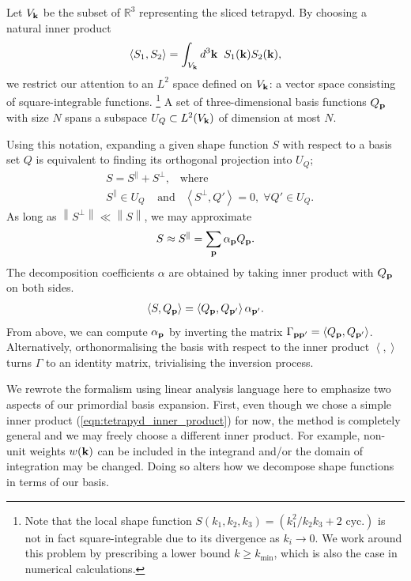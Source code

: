 Let $V_{\mathbf{k}}$ be the subset of $\mathbb{R}^3$ representing the sliced tetrapyd. By choosing a natural inner product
\begin{align}
	\left< S_1, S_2 \right> = \int_{V_{\mathbf{k}}} d^3\mathbf{k} \;\; S_1(\mathbf{k}) S_2(\mathbf{k}), \label{eqn:tetrapyd_inner_product}
\end{align}
we restrict our attention to an $L^2$ space defined on $V_{\mathbf{k}}$: a vector space consisting of square-integrable functions.
\footnote{Note that the local shape function $S(k_1,k_2,k_3) = (k_1^2 / k_2 k_3 + \text{2 cyc.})$ is not in fact square-integrable due to its divergence as $k_i \rightarrow 0$. We work around this problem by prescribing a lower bound $k \ge k_\text{min}$, which is also the case in numerical calculations.}
A set of three-dimensional basis functions $Q_{\mathbf{p}}$ with size $N$ spans a subspace $U_{Q} \subset L^2(V_{\mathbf{k}})$ of dimension at most $N$.

Using this notation, expanding a given shape function $S$ with respect to a basis set $Q$ is equivalent to finding its orthogonal projection into $U_{Q}$;
\begin{align}
	&S = S^{\parallel} + S^{\perp}, \;\;\;\text{where} \\
	&S^{\parallel} \in U_Q \;\;\;\;\text{and} \;\;\; \left< S^{\perp}, Q' \right> = 0, \; \forall Q' \in U_Q.
\end{align}
As long as $\left\| S^\perp \right\| \ll \left\| S \right\|$, we may approximate
\begin{align}
	S \approx S^\parallel = \sum_{\mathbf{p}} \alpha_{\mathbf{p}} Q_{\mathbf{p}}.  \label{eqn:primordial_basis_projection}
\end{align}
The decomposition coefficients $\alpha$ are obtained by taking inner product with $Q_{\mathbf{p}}$ on both sides.
\begin{align}
	\left< S, Q_\mathbf{p} \right> = \left< Q_\mathbf{p}, Q_{\mathbf{p}'} \right> \alpha_{\mathbf{p}'}. \label{eqn:primordial_basis_expansion_SQ_and_QQ}
\end{align}
From above, we can compute $\alpha_\mathbf{p}$ by inverting the matrix $\Gamma_{\mathbf{p} \mathbf{p}'} = \left< Q_\mathbf{p}, Q_{\mathbf{p}'} \right>$. Alternatively, orthonormalising the basis with respect to the inner product $\left< , \right>$ turns $\Gamma$ to an identity matrix, trivialising the inversion process.

We rewrote the formalism using linear analysis language here to emphasize two aspects of our primordial basis expansion. First, even though we chose a simple inner product (\ref{eqn:tetrapyd_inner_product}) for now, the method is completely general and we may freely choose a different inner product. For example, non-unit weights $w(\mathbf{k})$ can be included in the integrand and/or the domain of integration may be changed. Doing so alters how we decompose shape functions in terms of our basis.

